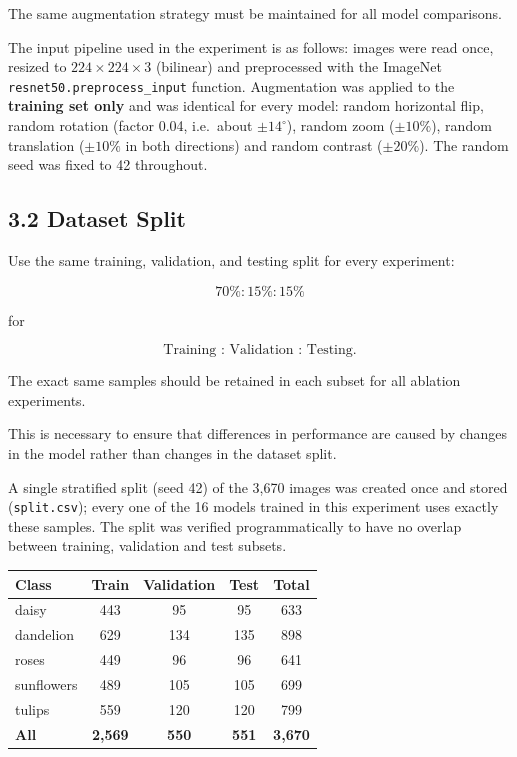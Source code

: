 \documentclass[10pt]{article}
\begin{document}
The same augmentation strategy must be maintained for all model comparisons.


The input pipeline used in the experiment is as follows: images were read once,
resized to $224\times224\times3$ (bilinear) and preprocessed with the
ImageNet \texttt{resnet50.preprocess\_input} function. Augmentation was applied to the
\textbf{training set only} and was identical for every model:
random horizontal flip, random rotation (factor 0.04, i.e.\ about $\pm14^{\circ}$),
random zoom ($\pm10\%$), random translation ($\pm10\%$ in both directions) and
random contrast ($\pm20\%$). The random seed was fixed to 42 throughout.

\subsection*{3.2 Dataset Split}

Use the same training, validation, and testing split for every experiment:

\[
\boxed{
70\% : 15\% : 15\%
}
\]

for

\[
\text{Training : Validation : Testing}.
\]

The exact same samples should be retained in each subset for all ablation
experiments.

This is necessary to ensure that differences in performance are caused by
changes in the model rather than changes in the dataset split.


A single stratified split (seed 42) of the 3{,}670 images was created once and stored
(\texttt{split.csv}); every one of the 16 models trained in this experiment uses exactly
these samples. The split was verified programmatically to have no overlap
between training, validation and test subsets.

\begin{center}
\begin{tabular}{|l|c|c|c|c|}
\hline
\textbf{Class} & \textbf{Train} & \textbf{Validation} & \textbf{Test} & \textbf{Total} \\
\hline
daisy & 443 & 95 & 95 & 633 \\
\hline
dandelion & 629 & 134 & 135 & 898 \\
\hline
roses & 449 & 96 & 96 & 641 \\
\hline
sunflowers & 489 & 105 & 105 & 699 \\
\hline
tulips & 559 & 120 & 120 & 799 \\
\hline
\textbf{All} & \textbf{2{,}569} & \textbf{550} & \textbf{551} & \textbf{3{,}670} \\
\hline
\end{tabular}
\end{center}
\end{document}

